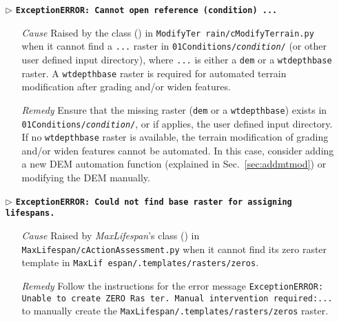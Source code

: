\begin{itemize}
	\item[$\triangleright$]\textbf{\texttt{ExceptionERROR: Cannot open reference (condition) ...}}
	\begin{itemize}
		\item[\textit{Cause}\hspace{0.27cm}] Raised by the  class () in \texttt{ModifyTer rain/cModifyTerrain.py} when it cannot find a \texttt{...} raster in \texttt{01{\myUnderscore}Conditions/\textit{condition}/} (or other user defined input directory), where \texttt{...} is either a \texttt{dem} or a \texttt{wt{\myUnderscore}depth{\myUnderscore}base} raster. A \texttt{wt{\myUnderscore}depth{\myUnderscore}base} raster is required for automated terrain modification after grading and/or widen features. 
		\item[\textit{Remedy}] Ensure that the missing raster (\texttt{dem} or a \texttt{wt{\myUnderscore}depth{\myUnderscore}base}) exists in \texttt{01{\myUnderscore}Conditions/\textit{condition}/}, or if applies, the user defined input directory. If no \texttt{wt{\myUnderscore}depth{\myUnderscore}base} raster is available, the terrain modification of grading and/or widen features cannot be automated. In this case, consider adding a new DEM automation function (explained in Sec.~\ref{sec:addmtmod}) or modifying the DEM manually.\\
	\end{itemize}
	
	\item[$\triangleright$]\textbf{\texttt{ExceptionERROR: Could not find base raster for assigning lifespans.}}
	\begin{itemize}
		\item[\textit{Cause}\hspace{0.27cm}] Raised by \textit{MaxLifespan}'s  class () in \texttt{MaxLifespan/cActionAssessment.py} when it cannot find its zero raster template in \texttt{MaxLif espan/.templates/rasters/zeros}.
		\item[\textit{Remedy}] Follow the instructions for the error message \texttt{ExceptionERROR: Unable to create ZERO Ras ter. Manual intervention required:...} to manually create the \texttt{MaxLifespan/.templates/rasters/zeros} raster.\\
	\end{itemize}
	

\end{itemize}
